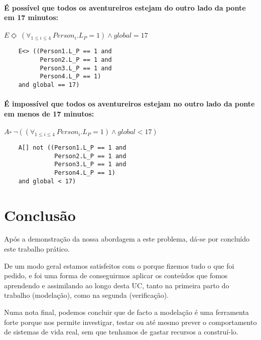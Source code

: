 \documentclass[12pt]{extarticle}
\begin{document}
\paragraph{É possível que todos os aventureiros estejam do outro lado da ponte em 17 minutos:}{
	$E \Diamond\ (\forall_{1 \leq i \leq 4}\ Person_{i}.L_P = 1) \land global = 17$
}

\begin{verbatim}
	E<> ((Person1.L_P == 1 and 
		  Person2.L_P == 1 and
		  Person3.L_P == 1 and
		  Person4.L_P == 1)
	and global == 17)
\end{verbatim}

\paragraph{É impossível que todos os aventureiros estejam no outro lado da ponte em menos de 17 minutos:}{
	$A \square\ \neg((\forall_{1 \leq i \leq 4}\ Person_{i}.L_P = 1) \land global < 17)$
}

\begin{verbatim}
	A[] not ((Person1.L_P == 1 and
			  Person2.L_P == 1 and
			  Person3.L_P == 1 and
			  Person4.L_P == 1)
	and global < 17)
\end{verbatim}


\section{Conclusão}
Após a demonstração da nossa abordagem a este problema, dá-se por concluído este trabalho prático.

De um modo geral estamos satisfeitos com o porque fizemos tudo o que foi pedido, e foi uma forma de conseguirmos aplicar os conteúdos que fomos aprendendo e assimilando ao longo desta UC, tanto na primeira parto do trabalho (modelação), como na segunda (verificação).

Numa nota final, podemos concluir que de facto a modelação é uma ferramenta forte porque nos permite investigar, testar ou até mesmo prever o comportamento de sistemas de vida real, sem que tenhamos de gastar recursos a construí-lo.
\end{document}
